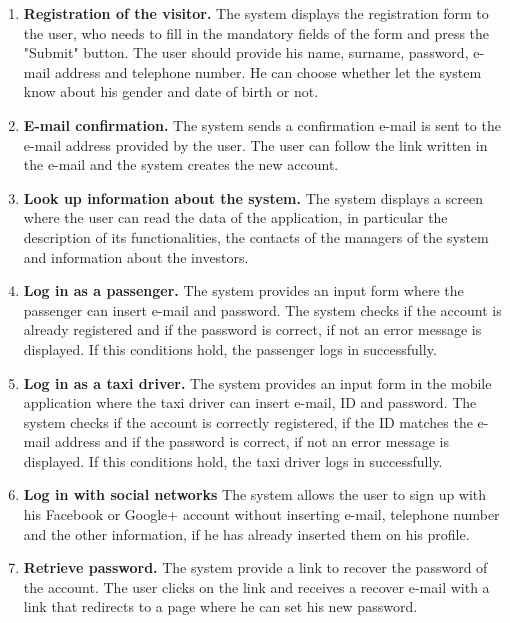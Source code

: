 \documentclass[18pt,oneside,a4paper, titlepage]{article}
\begin{document}
		\begin{enumerate}
			\item \textbf{Registration of the visitor.}
				The system displays the registration form to the user, who needs to fill in the mandatory fields of the form and press the "Submit" button. The user should provide his name, surname, password, e-mail address and telephone number. He can choose whether let the system know about his gender and date of birth or not.
			
			\item \textbf{E-mail confirmation.}
				The system sends a confirmation e-mail is sent to the e-mail address provided by the user. The user can follow the link written in the e-mail and the system creates the new account.
				
			\item \textbf{Look up information about the system.}
				The system displays a screen where the user can read the data of the application, in particular the description of its functionalities, the contacts of the managers of the system and information about the investors.
				
			\item \textbf{Log in as a passenger.}
				The system provides an input form where the passenger can insert e-mail and password. The system checks if the account is already registered and if the password is correct, if not an error message is displayed. If this conditions hold, the passenger logs in successfully.
				
			\item \textbf{Log in as a taxi driver.}
				The system provides an input form in the mobile application where the taxi driver can insert e-mail, ID and password. The system checks if the account is correctly registered, if the ID matches the e-mail address and if the password is correct, if not an error message is displayed. If this conditions hold, the taxi driver logs in successfully.
				
			\item \textbf{Log in with social networks}
				The system allows the user to sign up with his Facebook or Google+ account without inserting e-mail, telephone number and the other information, if he has already inserted them on his profile.
				
			\item \textbf{Retrieve password.}
				The system provide a link to recover the password of the account. The user clicks on the link and receives a recover e-mail with a link that redirects to a page where he can set his new password.
				

\end{enumerate}
\end{document}

